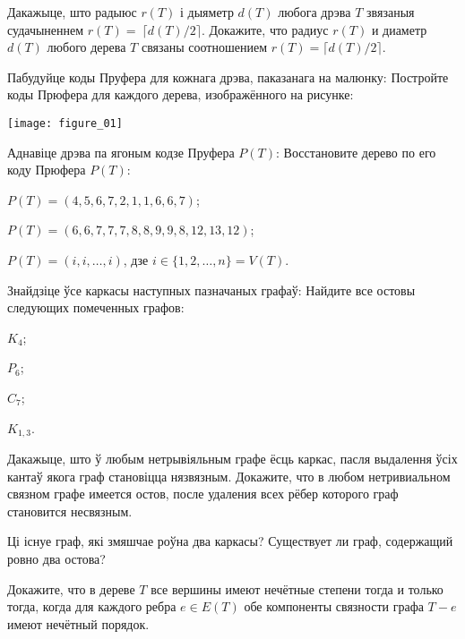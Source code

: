 \documentclass[12pt, a4paper]{article}
\begin{document}
\begin{problemList}
\medskip

\problemItemSimple
{Дакажыце, што радыюс $r(T)$ і дыяметр $d(T)$ любога дрэва $T$ звязаныя судачыненнем $r(T)=~\lceil d(T)/2 \rceil$.}
{Докажите, что радиус $r(T)$ и диаметр $d(T)$ любого дерева $T$ связаны соотношением $r(T)=\lceil d(T)/2 \rceil$.}

\bigskip

\problemItemWithCommonPart
{Пабудуйце коды Пруфера для кожнага дрэва, паказанага на малюнку:}
{Постройте коды Прюфера для каждого дерева, изображённого на рисунке:}
{%
\begin{center}
    \texttt{[image: figure\_01]}
\end{center}
}

\problemItemWithCommonPart
{Аднавіце дрэва па ягоным кодзе Пруфера $P(T)$:}
{Восстановите дерево по его коду Прюфера $P(T)$:}
{%
\begin{belarusianEnumerate}
    \item $P(T)=(4, 5, 6, 7, 2, 1, 1, 6, 6, 7)$;
    \item $P(T)=(6, 6, 7, 7, 7, 8, 8, 9, 9, 8, 12, 13, 12)$;
    \item $P(T)=(i, i, \ldots, i)$, дзе $i\in\{1, 2, \ldots, n\}=V(T)$.
\end{belarusianEnumerate}
}

\smallskip

\problemItemWithCommonPart
{Знайдзіце ўсе каркасы наступных пазначаных графаў:}
{Найдите все остовы следующих помеченных графов:}
{%
\begin{belarusianEnumerateTwocol}
    \item $K_4$;
    \item $P_6$;
    \item $C_7$;
    \item $K_{1, 3}$.
\end{belarusianEnumerateTwocol}
}

\smallskip

\problemItemSimple
{Дакажыце, што ў любым нетрывіяльным графе ёсць каркас,
пасля выдалення ўсіх кантаў якога граф становіцца нязвязным.}
{Докажите, что в любом нетривиальном связном графе имеется остов,
после удаления всех рёбер которого граф становится несвязным.}

\bigskip

\problemItemSimple
{Ці існуе граф, які змяшчае роўна два каркасы?}
{Существует ли граф, содержащий ровно два остова?}

\bigskip

{Докажите, что в дереве $T$ все вершины имеют нечётные степени тогда и только тогда, когда для каждого ребра $e\in E(T)$ обе компоненты связности графа $T-e$ имеют нечётный порядок.}


\end{problemList}
\end{document}

